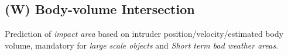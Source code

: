 \subsection{(W) Body-volume Intersection}\label{s:bodyvolumeIntersection}
    \noindent Prediction of \emph{impact area} based on intruder position/velocity/estimated body volume, mandatory for \emph{large scale objects} and \emph{Short term bad weather areas}.
    
